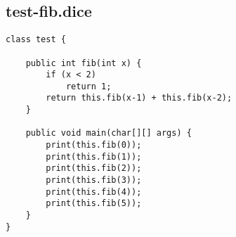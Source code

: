 \subsection{test-fib.dice}
\begin{verbatim}
class test {
	
	public int fib(int x) {
  		if (x < 2) 
  			return 1;
  		return this.fib(x-1) + this.fib(x-2);
	}

	public void main(char[][] args) {
		print(this.fib(0));
		print(this.fib(1));
		print(this.fib(2));
		print(this.fib(3));
		print(this.fib(4));
		print(this.fib(5));
	}
}
\end{verbatim}